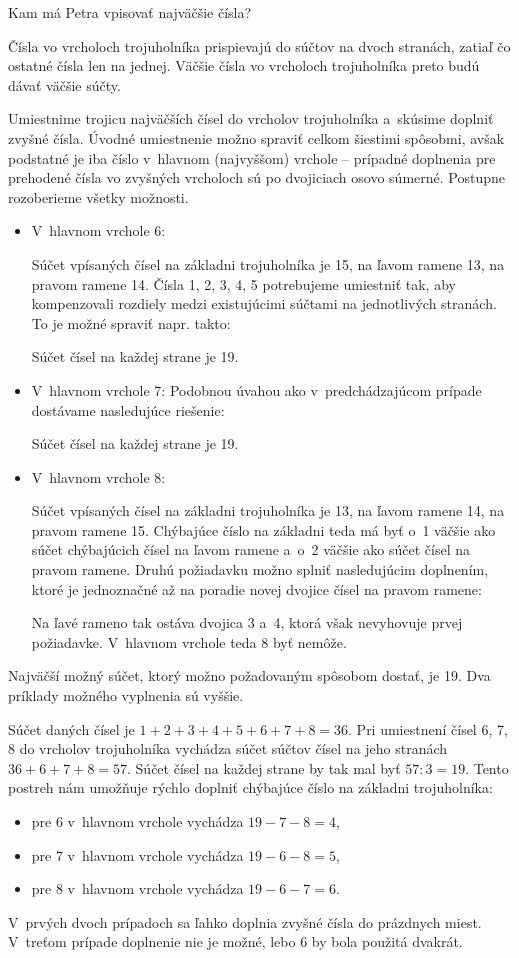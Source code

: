 {%
\napad
Kam má Petra vpisovať najväčšie čísla?

\riesenie
Čísla vo vrcholoch trojuholníka prispievajú do súčtov na dvoch stranách, zatiaľ čo ostatné čísla len na jednej.
Väčšie čísla vo vrcholoch trojuholníka preto budú dávať väčšie súčty.

Umiestnime trojicu najväčších čísel do vrcholov trojuholníka a~skúsime doplniť zvyšné čísla.
Úvodné umiestnenie možno spraviť celkom šiestimi spôsobmi, avšak podstatné je iba číslo v~hlavnom (najvyššom) vrchole -- prípadné doplnenia pre prehodené čísla vo zvyšných vrcholoch sú po dvojiciach osovo súmerné.
Postupne rozoberieme všetky možnosti.

\begin{itemize}
\item V~hlavnom vrchole 6:
%


Súčet vpísaných čísel na základni trojuholníka je 15, na ľavom ramene 13, na pravom ramene 14.
Čísla 1, 2, 3, 4, 5 potrebujeme umiestniť tak, aby kompenzovali rozdiely medzi existujúcimi súčtami na jednotlivých stranách.
To je možné spraviť napr. takto:
%


Súčet čísel na každej strane je 19.

\item V~hlavnom vrchole 7:
Podobnou úvahou ako v~predchádzajúcom prípade dostávame nasledujúce riešenie:
%


Súčet čísel na každej strane je 19.

\item V~hlavnom vrchole 8:
%


Súčet vpísaných čísel na základni trojuholníka je 13, na ľavom ramene 14, na pravom ramene 15.
Chýbajúce číslo na základni teda má byť o~1 väčšie ako súčet chýbajúcich čísel na ľavom ramene a~o~2 väčšie ako súčet čísel na pravom ramene.
Druhú požiadavku možno splniť nasledujúcim doplnením, ktoré je jednoznačné až na poradie novej dvojice čísel na pravom ramene:
%


Na ľavé rameno tak ostáva dvojica 3 a~4, ktorá však nevyhovuje prvej požiadavke.
V~hlavnom vrchole teda 8 byť nemôže.
\end{itemize}

Najväčší možný súčet, ktorý možno požadovaným spôsobom dostať, je 19.
Dva príklady možného vyplnenia sú vyššie.

\poznamka
Súčet daných čísel je $1+2+3+4+5+6+7+8=36$.
Pri umiestnení čísel 6, 7, 8 do vrcholov trojuholníka vychádza súčet súčtov čísel na jeho stranách $36+6+7+8=57$.
Súčet čísel na každej strane by tak mal byť $57:3=19$.
Tento postreh nám umožňuje rýchlo doplniť chýbajúce číslo na základni trojuholníka:
\begin{itemize}
\item pre 6 v~hlavnom vrchole vychádza $19-7-8=4$,
\item pre 7 v~hlavnom vrchole vychádza $19-6-8=5$,
\item pre 8 v~hlavnom vrchole vychádza $19-6-7=6$.
\end{itemize}
V~prvých dvoch prípadoch sa ľahko doplnia zvyšné čísla do prázdnych miest.
V~treťom prípade doplnenie nie je možné, lebo 6 by bola použitá dvakrát.
}

